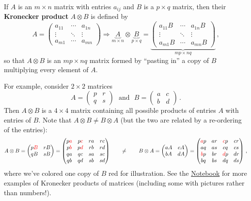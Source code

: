 \begin{definition}If $A$ is an $m\times n$ matrix with entries
$a_{ij}$ and $B$ is a $p\times q$ matrix, then their \textbf{Kronecker
product} $A\otimes B$ is defined by
\[
A=\left(\begin{array}{ccc}
a_{11} & \cdots & a_{1n}\\
\vdots & \ddots & \vdots\\
a_{m1} & \cdots & a_{mn}
\end{array}\right)\Longrightarrow\underbrace{A}_{m\times n}\otimes\underbrace{B}_{p\times q}=\underbrace{\left(\begin{array}{ccc}
a_{11}B & \cdots & a_{1n}B\\
\vdots & \ddots & \vdots\\
a_{m1}B & \cdots & a_{mn}B
\end{array}\right)}_{mp\times nq}\,,
\]
so that $A\otimes B$ is an $mp\times nq$ matrix formed by ``pasting
in'' a copy of $B$ multiplying every element of $A$. \end{definition}
For example, consider $2\times2$ matrices
\[
A=\begin{pmatrix}p & r\\
q & s
\end{pmatrix}\text{~~and~~}B=\begin{pmatrix}a & c\\
b & d
\end{pmatrix} \, .
\]
Then $A\otimes B$ is a $4\times4$ matrix containing all possible
products of entries $A$ with entries of $B$. Note that $A\otimes B\ne B\otimes A$
(but the two are related by a re-ordering of the entries): 
\[
A\otimes B=\begin{pmatrix}p\textcolor{red}{B} & rB\\
qB & sB
\end{pmatrix}=\begin{pmatrix}p\textcolor{red}{a} & p\textcolor{red}{c} & ra & rc\\
p\textcolor{red}{b} & p\textcolor{red}{d} & rb & rd\\
qa & qc & sa & sc\\
qb & qd & sb & sd
\end{pmatrix}\qquad\ne\qquad B\otimes A=\begin{pmatrix}aA & cA\\
bA & dA
\end{pmatrix}=\begin{pmatrix}\textcolor{red}{a}p & ar & \textcolor{red}{c}p & cr\\
aq & as & cq & cs\\
\textcolor{red}{b}p & br & \textcolor{red}{d}p & dr\\
bq & bs & dq & ds
\end{pmatrix} \, ,
\]
where we've colored one copy of $B$ red for illustration.
See the \href{https://rawcdn.githack.com/mitmath/matrixcalc/3f6758996e40c5c1070279f89f7f65e76e08003d/notes/2x2Jacobians.jl.html}{Notebook}
for more examples of Kronecker products of matrices (including some
with pictures rather than numbers!). 

